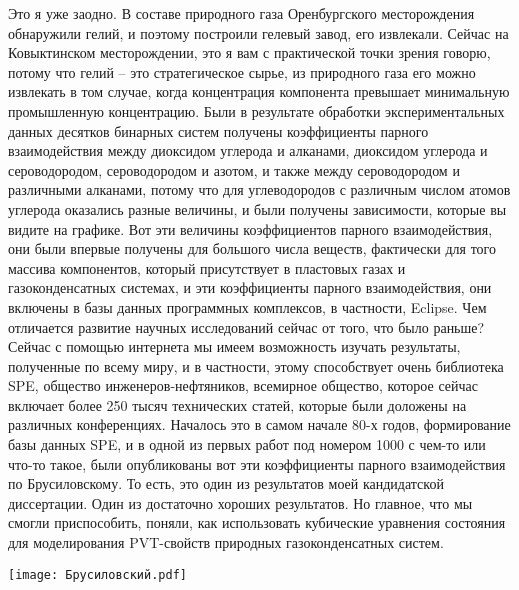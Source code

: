 \documentclass[main.tex]{subfiles}
\begin{document}
Это я уже заодно.
В составе природного газа Оренбургского месторождения обнаружили гелий, и поэтому построили гелевый завод, его извлекали.
Сейчас на Ковыктинском месторождении, это я вам с практической точки зрения говорю, потому что гелий -- это стратегическое сырье, из природного газа его можно извлекать в том случае, когда концентрация компонента превышает минимальную промышленную концентрацию.
Были в результате обработки экспериментальных данных десятков бинарных систем получены коэффициенты парного взаимодействия между диоксидом углерода и алканами, диоксидом углерода и сероводородом, сероводородом и азотом, и также между сероводородом и различными алканами, потому что для углеводородов с различным числом атомов углерода оказались разные величины, и были получены зависимости, которые вы видите на графике.
Вот эти величины коэффициентов парного взаимодействия, они были впервые получены для большого числа веществ, фактически для того массива компонентов, который присутствует в пластовых газах и газоконденсатных системах, и эти коэффициенты парного взаимодействия, они включены в базы данных программных комплексов, в частности, Eclipse.
Чем отличается развитие научных исследований сейчас от того, что было раньше?
Сейчас с помощью интернета мы имеем возможность изучать результаты, полученные по всему миру, и в частности, этому способствует очень библиотека SPE, общество инженеров-нефтяников, всемирное общество, которое сейчас включает более 250 тысяч технических статей, которые были доложены на различных конференциях.
Началось это в самом начале 80-х годов, формирование базы данных SPE, и в одной из первых работ под номером 1000 с чем-то или что-то такое, были опубликованы вот эти коэффициенты парного взаимодействия по Брусиловскому.
То есть, это один из результатов моей кандидатской диссертации.
Один из достаточно хороших результатов.
Но главное, что мы смогли приспособить, поняли, как использовать кубические уравнения состояния для моделирования PVT-свойств природных газоконденсатных систем.

\begin{center}
\texttt{[image: Брусиловский.pdf]}
\end{center}
\end{document}
